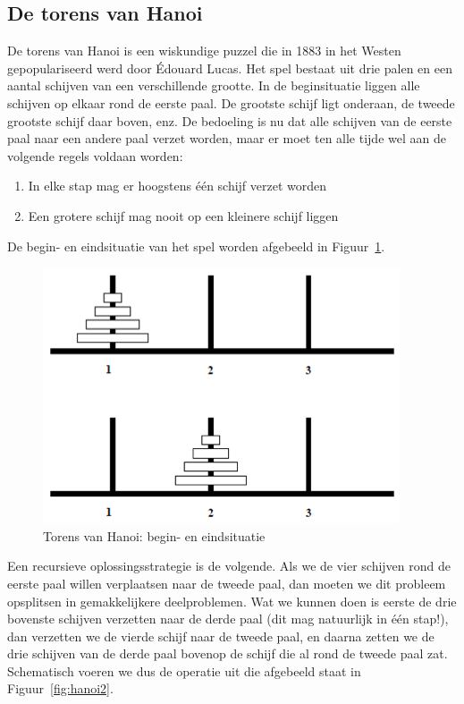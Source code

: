 \subsection{De torens van Hanoi}

De torens van Hanoi is een wiskundige puzzel die in 1883 in het Westen gepopulariseerd werd door \'Edouard Lucas. Het spel bestaat uit drie palen en een aantal schijven van een verschillende grootte. In de beginsituatie liggen alle schijven op elkaar rond de eerste paal. De grootste schijf ligt onderaan, de tweede grootste schijf daar boven, enz. De bedoeling is nu dat alle schijven van de eerste paal naar een andere paal verzet worden, maar er moet ten alle tijde wel aan de volgende regels voldaan worden:

\begin{enumerate}
\item In elke stap mag er hoogstens \'e\'en schijf verzet worden
\item Een grotere schijf mag nooit op een kleinere schijf liggen
\end{enumerate}

De begin- en eindsituatie van het spel worden afgebeeld in Figuur~\ref{fig:hanoi1}.

\begin{figure}
\centering
\includegraphics[scale=0.8]{Recursie/hanoi1.png}
\caption{Torens van Hanoi: begin- en eindsituatie}\label{fig:hanoi1}
\end{figure}

Een recursieve oplossingsstrategie is de volgende. Als we de vier schijven rond de eerste paal willen verplaatsen naar de tweede paal, dan moeten we dit probleem opsplitsen in gemakkelijkere deelproblemen. Wat we kunnen doen is eerste de drie bovenste schijven verzetten naar de derde paal (dit mag natuurlijk in \'e\'en stap!), dan verzetten we de vierde schijf naar de tweede paal, en daarna zetten we de drie schijven van de derde paal bovenop de schijf die al rond de tweede paal zat. Schematisch voeren we dus de operatie uit die afgebeeld staat in Figuur~\ref{fig:hanoi2}.

